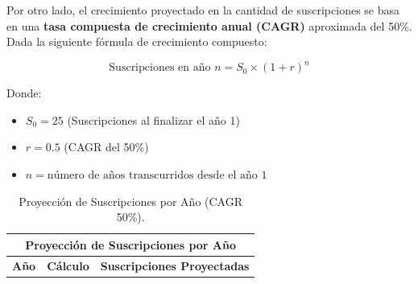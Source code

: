 {\begin{table}[H]
\begin{tabular}{|l|r|}
    \end{tabular}
\end{table}






Por otro lado, el crecimiento proyectado en la cantidad de suscripciones se basa en una \textbf{tasa compuesta de crecimiento anual (CAGR)} aproximada del 50\%.  Dada la siguiente fórmula de crecimiento compuesto:

$$
\text{Suscripciones en año } n = S_0 \times (1 + r)^n
$$

Donde:
\begin{itemize}
    \item $S_0 = 25$ (Suscripciones al finalizar el año 1)
    \item $r = 0.5$ (CAGR del 50\%) %
    \item $n = \text{número de años transcurridos desde el año 1}$
\end{itemize}



\begin{table}[H]

    \centering
    
    \caption{Proyección de Suscripciones por Año (CAGR 50\%).}
    
    \label{tab:proyeccion_suscripciones}
    
    \begin{tabular}{|c|c|c|}
    
    \hline
    \multicolumn{3}{|c|}{\textbf{Proyección de Suscripciones por Año}}\\
    \hline
    \textbf{Año} & \textbf{Cálculo} & \textbf{Suscripciones Proyectadas}\\
    \hline
    

\end{tabular}
\end{table}}
